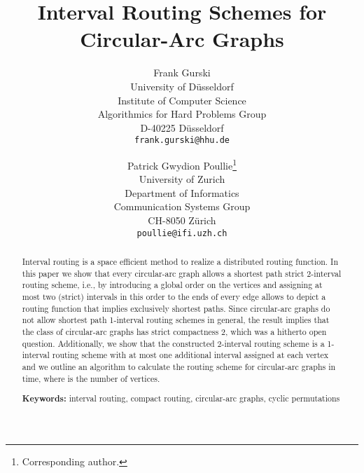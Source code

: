 \documentclass[10pt]{article}
\begin{document}
\title{Interval Routing Schemes for Circular-Arc Graphs}

\author{
Frank Gurski \\
University of D\"usseldorf\\
Institute of Computer Science\\
Algorithmics for Hard Problems Group\\
D-40225 D\"usseldorf\\
\texttt{frank.gurski@hhu.de}
\and 
Patrick Gwydion Poullie\thanks{Corresponding author.} \\
University of Zurich \\
Department of Informatics \\ Communication Systems Group\\
CH-8050 Z\"urich\\
\texttt{poullie@ifi.uzh.ch}
}


\maketitle





\begin{abstract}
Interval routing is a space efficient method to realize a distributed 
routing function.
In this paper we show that every circular-arc graph allows a shortest 
path strict 2-interval routing scheme, i.e., by introducing a global order
on the vertices and assigning at most two (strict) intervals in this order
to the ends of every edge allows to depict a routing function that 
implies exclusively shortest paths. Since circular-arc graphs do not allow shortest path 1-interval routing 
schemes in general, the result implies that the class of circular-arc 
graphs has strict compactness 2, which was a hitherto open question.
Additionally, we show that the constructed 2-interval routing scheme is 
a 1-interval routing scheme with at most one additional 
interval assigned at each vertex and we outline an algorithm 
to calculate the routing scheme for circular-arc graphs in 
 time, where  is the number of vertices.

\bigskip
\noindent
{\bf Keywords:} interval routing, compact routing, circular-arc graphs, cyclic permutations
\end{abstract}
\end{document}
